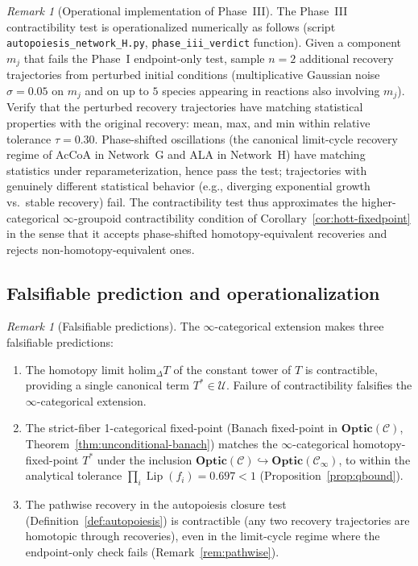 \documentclass[11pt,a4paper]{article}
\theoremstyle{plain}
\theoremstyle{definition}
\theoremstyle{remark}
\newtheorem{remark}[theorem]{Remark}
\newcommand{\Optic}{\mathbf{Optic}}
\DeclareMathOperator{\Lip}{Lip}
\begin{document}
\begin{remark}[Operational implementation of Phase~III]
\label{rem:phase3-operational}
The Phase~III contractibility test is operationalized numerically as
follows (script \texttt{autopoiesis\_network\_H.py},
\texttt{phase\_iii\_verdict} function). Given a component $m_j$ that
fails the Phase~I endpoint-only test, sample $n = 2$ additional recovery
trajectories from perturbed initial conditions (multiplicative Gaussian
noise $\sigma = 0.05$ on $m_j$ and on up to $5$ species appearing in
reactions also involving $m_j$). Verify that the perturbed recovery
trajectories have matching statistical properties with the original
recovery: mean, max, and min within relative tolerance
$\tau = 0.30$. Phase-shifted oscillations (the canonical limit-cycle
recovery regime of AcCoA in Network~G and ALA in Network~H) have
matching statistics under reparameterization, hence pass the test;
trajectories with genuinely different statistical behavior (e.g.,
diverging exponential growth vs.\ stable recovery) fail. The
contractibility test thus approximates the higher-categorical
$\infty$-groupoid contractibility condition of Corollary~\ref{cor:hott-fixedpoint}
in the sense that it accepts phase-shifted homotopy-equivalent
recoveries and rejects non-homotopy-equivalent ones.
\end{remark}

\subsection{Falsifiable prediction and operationalization}

\begin{remark}[Falsifiable predictions]
\label{rem:hott-falsifiable}
The $\infty$-categorical extension makes three falsifiable predictions:
\begin{enumerate}[leftmargin=*, itemsep=2pt]
\item The homotopy limit $\mathrm{holim}_\Delta T$ of the constant tower
of $T$ is contractible, providing a single canonical term $T^* \in
\mathcal{U}$. Failure of contractibility falsifies the
$\infty$-categorical extension.
\item The strict-fiber 1-categorical fixed-point (Banach fixed-point in
$\Optic(\mathcal{C})$, Theorem~\ref{thm:unconditional-banach}) matches
the $\infty$-categorical homotopy-fixed-point $T^*$ under the
inclusion $\Optic(\mathcal{C}) \hookrightarrow
\Optic(\mathcal{C}_\infty)$, to within the analytical tolerance
$\prod_i \Lip(f_i) = 0.697 < 1$ (Proposition~\ref{prop:qbound}).
\item The pathwise recovery in the autopoiesis closure test
(Definition~\ref{def:autopoiesis}) is contractible (any two recovery
trajectories are homotopic through recoveries), even in the limit-cycle
regime where the endpoint-only check fails (Remark~\ref{rem:pathwise}).
\end{enumerate}
\end{remark}
\end{document}

